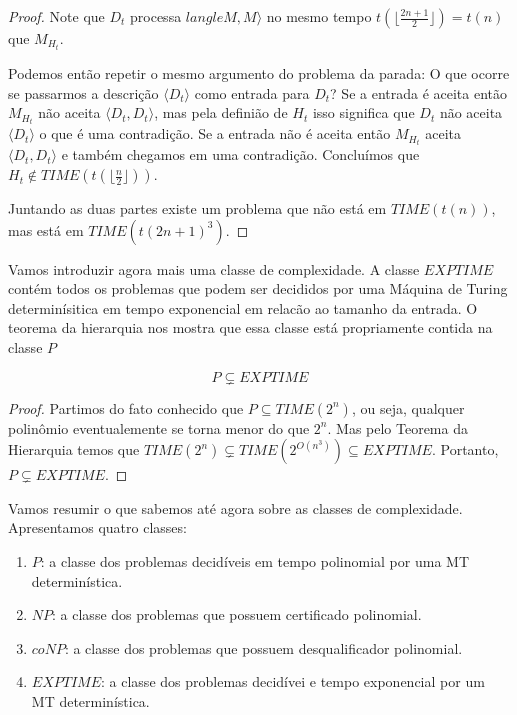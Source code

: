\begin{proof}
  Note que $D_t$ processa $langle M, M \rangle$ no mesmo tempo $t(\lfloor \frac{2n+1}{2}\rfloor) = t(n)$ que $M_{H_t}$.

  Podemos então repetir o mesmo argumento do problema da parada:
  O que ocorre se passarmos a descrição $\langle D_t \rangle$ como entrada para $D_t$?
  Se a entrada é aceita então $M_{H_t}$ não aceita $\langle D_t, D_t \rangle$, mas pela definião de $H_t$ isso significa que $D_t$ não aceita $\langle D_t \rangle$ o que é uma contradição.
  Se a entrada não é aceita então $M_{H_t}$ aceita $\langle D_t, D_t \rangle$ e também chegamos em uma contradição.
  Concluímos que $H_t \notin TIME(t(\lfloor \frac{n}{2}\rfloor))$.

  Juntando as duas partes existe um problema que não está em $TIME(t(n))$, mas está em $TIME(t(2n + 1)^3)$.
\end{proof}

Vamos introduzir agora mais uma classe de complexidade.
A classe $EXPTIME$ contém todos os problemas que podem ser decididos por uma Máquina de Turing determinísitica em tempo exponencial em relacão ao tamanho da entrada.
O teorema da hierarquia nos mostra que essa classe está propriamente contida na classe $P$

\begin{corollary}
  \begin{displaymath}
    P \subsetneq EXPTIME
  \end{displaymath}
\end{corollary}
\begin{proof}
  Partimos do fato conhecido que $P \subseteq TIME(2^n)$, ou seja, qualquer polinômio eventualemente se torna menor do que $2^n$.
  Mas pelo Teorema da Hierarquia temos que $TIME(2^n) \varsubsetneq TIME(2^{O(n^3)}) \subseteq EXPTIME$.
  Portanto, $P \varsubsetneq EXPTIME$.
\end{proof}

Vamos resumir o que sabemos até agora sobre as classes de complexidade.
Apresentamos quatro classes:
\begin{enumerate}
\item $P$: a classe dos problemas decidíveis em tempo polinomial por uma MT determinística.
\item $NP$: a classe dos problemas que possuem certificado polinomial.
\item $coNP$: a classe dos problemas que possuem desqualificador polinomial.
\item $EXPTIME$: a classe dos problemas decidívei e tempo exponencial por um MT determinística.
\end{enumerate}

